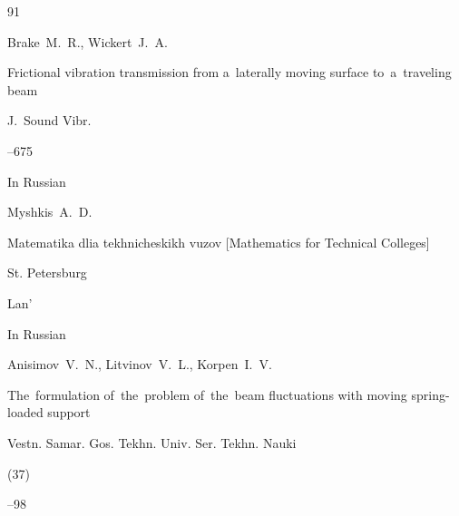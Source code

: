 \begin{thebibliography}{91}










\by Brake~M.~R., Wickert~J.~A.

\paper Frictional vibration transmission from a~laterally moving surface to~a~traveling beam

\jour J.~Sound Vibr.




--675











\lang In Russian

\by Myshkis~A.~D.

\book Matematika dlia tekhnicheskikh vuzov \rm [Mathematics for Technical Colleges]

\publaddr St. Petersburg

\publ Lan'






\lang In Russian

\by Anisimov~V.~N., Litvinov~V.~L., Korpen~I.~V.

\paper The~formulation of~the~problem of~the~beam fluctuations with moving spring-loaded support

\jour Vestn. Samar. Gos. Tekhn. Univ. Ser. Tekhn. Nauki


(37)

--98





\end{thebibliography}

\EngDate



\Russian

\newpage



%

